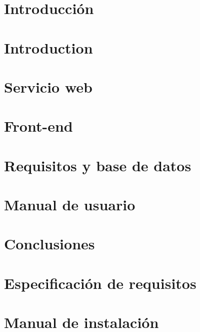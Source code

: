 \documentclass[11pt,a4paper]{article}
\begin{document}
{\setlength{\parskip}{0.4cm plus4mm minus3mm}


\newpage
\section{Introducci\'on\label{sec:intro}}


\newpage
\section{Introduction\label{sec:introEn}}


\newpage
\section{Servicio web\label{sec:s_web}}


\newpage
\section{Front-end\label{sec:front}}


\newpage
\section{Requisitos y base de datos\label{sec:req}}



\newpage
\section{Manual de usuario\label{sec:manual}}


\newpage
\section{Conclusiones\label{sec:conc}}


\newpage
{\small


}


\newpage
\appendix

\section{Especificación de requisitos\label{app:req}}


\newpage
\section{Manual de instalación\label{app:manual}}

}
\appendix


%
\end{document}
